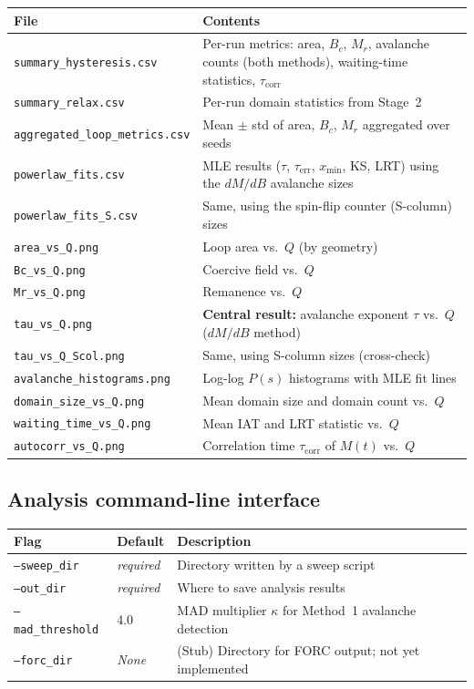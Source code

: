 \documentclass[11pt,a4paper]{article}
\newcommand{\file}[1]{\texttt{#1}}
\newcommand{\param}[1]{\texttt{--#1}}
\begin{document}
\begin{longtable}{p{5.5cm}p{9.5cm}}
\toprule
File & Contents \\
\midrule
\endhead
\file{summary\_hysteresis.csv} & Per-run metrics: area, $B_c$, $M_r$,
  avalanche counts (both methods), waiting-time statistics, $\tau_{\mathrm{corr}}$ \\
\file{summary\_relax.csv} & Per-run domain statistics from Stage~2 \\
\file{aggregated\_loop\_metrics.csv} & Mean $\pm$ std of area, $B_c$, $M_r$
  aggregated over seeds \\
\file{powerlaw\_fits.csv} & MLE results ($\tau$, $\tau_{\mathrm{err}}$, $x_{\min}$, KS,
  LRT) using the $dM/dB$ avalanche sizes \\
\file{powerlaw\_fits\_S.csv} & Same, using the spin-flip counter (S-column) sizes \\
\file{area\_vs\_Q.png} & Loop area vs.\ $Q$ (by geometry) \\
\file{Bc\_vs\_Q.png} & Coercive field vs.\ $Q$ \\
\file{Mr\_vs\_Q.png} & Remanence vs.\ $Q$ \\
\file{tau\_vs\_Q.png} & \textbf{Central result:} avalanche exponent $\tau$ vs.\ $Q$
  ($dM/dB$ method) \\
\file{tau\_vs\_Q\_Scol.png} & Same, using S-column sizes (cross-check) \\
\file{avalanche\_histograms.png} & Log-log $P(s)$ histograms with MLE fit lines \\
\file{domain\_size\_vs\_Q.png} & Mean domain size and domain count vs.\ $Q$ \\
\file{waiting\_time\_vs\_Q.png} & Mean IAT and LRT statistic vs.\ $Q$ \\
\file{autocorr\_vs\_Q.png} & Correlation time $\tau_{\mathrm{corr}}$ of $M(t)$ vs.\ $Q$ \\
\bottomrule
\end{longtable}

\subsection{Analysis command-line interface}

\begin{tabular}{p{4cm}p{2.2cm}p{8.5cm}}
\toprule
Flag & Default & Description \\
\midrule
\param{sweep\_dir} & \textit{required} & Directory written by a sweep script \\
\param{out\_dir} & \textit{required} & Where to save analysis results \\
\param{mad\_threshold} & 4.0 & MAD multiplier $\kappa$ for Method~1 avalanche detection \\
\param{forc\_dir} & \textit{None} & (Stub) Directory for FORC output; not yet implemented \\
\bottomrule
\end{tabular}
\end{document}
